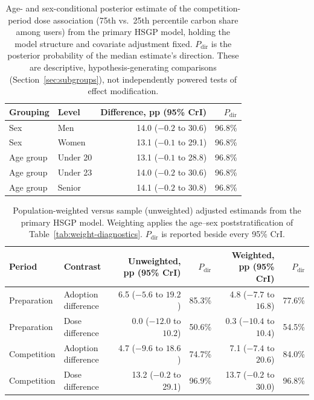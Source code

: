 \begin{table}[htbp]
\centering
\caption{Age- and sex-conditional posterior estimate of the competition-period dose association (75th vs.\ 25th percentile carbon share among users) from the primary HSGP model, holding the model structure and covariate adjustment fixed. $P_{\mathrm{dir}}$ is the posterior probability of the median estimate's direction. These are descriptive, hypothesis-generating comparisons (Section~\ref{sec:subgroups}), not independently powered tests of effect modification.}
\label{tab:subgroups}
\begin{tabular}{llrr}
\toprule
Grouping & Level & Difference, pp (95\% CrI) & $P_{\mathrm{dir}}$ \\
\midrule
Sex & Men & 14.0 ($-0.2$ to 30.6) & 96.8\% \\
Sex & Women & 13.1 ($-0.1$ to 29.1) & 96.8\% \\
Age group & Under 20 & 13.1 ($-0.1$ to 28.8) & 96.8\% \\
Age group & Under 23 & 14.0 ($-0.2$ to 30.6) & 96.8\% \\
Age group & Senior & 14.1 ($-0.2$ to 30.8) & 96.8\% \\
\bottomrule
\end{tabular}
\end{table}

\begin{table}[htbp]
\centering
\caption{Population-weighted versus sample (unweighted) adjusted estimands from the primary HSGP model. Weighting applies the age--sex poststratification of Table~\ref{tab:weight-diagnostics}. $P_{\mathrm{dir}}$ is reported beside every 95\% CrI.}
\label{tab:weighted-vs-unweighted}
\small
\begin{tabular}{llrrrr}
\toprule
Period & Contrast & Unweighted, pp (95\% CrI) & $P_{\mathrm{dir}}$ & Weighted, pp (95\% CrI) & $P_{\mathrm{dir}}$ \\
\midrule
Preparation & Adoption difference & 6.5 ($-5.6$ to $19.2$) & 85.3\% & 4.8 ($-7.7$ to $16.8$) & 77.6\% \\
Preparation & Dose difference & 0.0 ($-12.0$ to $10.2$) & 50.6\% & 0.3 ($-10.4$ to $10.4$) & 54.5\% \\
Competition & Adoption difference & 4.7 ($-9.6$ to $18.6$) & 74.7\% & 7.1 ($-7.4$ to $20.6$) & 84.0\% \\
Competition & Dose difference & 13.2 ($-0.2$ to 29.1) & 96.9\% & 13.7 ($-0.2$ to 30.0) & 96.8\% \\
\bottomrule
\end{tabular}
\end{table}

